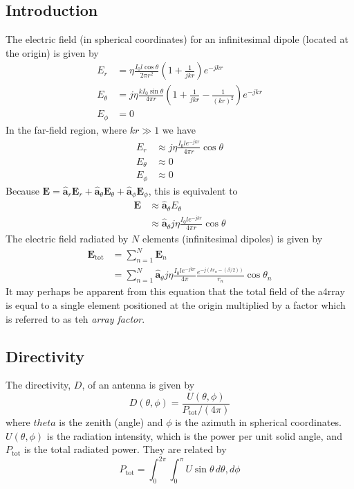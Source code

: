\documentclass[11pt]{report}
\theoremstyle{example}
\begin{document}
\subsection{Introduction}
The electric field (in spherical coordinates) for an infinitesimal dipole (located at the origin) is given by
\begin{align}
	E_r&=\eta\frac{I_0l\cos{\theta}}{2\pi r^2}\left(1+\frac{1}{jkr}\right)e^{-jkr}\\
	E_\theta&=j\eta\frac{kI_0\sin{\theta}}{4\pi r}\left(1+\frac{1}{jkr}-\frac{1}{(kr)^2}\right)e^{-jkr}\\
	E_\phi&=0
\end{align}
In the far-field region, where $kr\gg 1$ we have
\begin{align}
	E_r&\approx j\eta\frac{I_0le^{-jkr}}{4\pi r}\cos{\theta}\\
	E_\theta&\approx 0\\
	E_\phi&\approx 0
\end{align}
Because $\mathbf{E}=\mathbf{\hat{a}}_r\mathbf{E}_r+\mathbf{\hat{a}}_\theta\mathbf{E}_\theta+\mathbf{\hat{a}}_\phi\mathbf{E}_\phi$, this is equivalent to
\begin{equation}
	\begin{split}
		\mathbf{E}&\approx\mathbf{\hat{a}}_\theta E_\theta\\
		&\approx\mathbf{\hat{a}}_\theta j\eta\frac{I_0le^{-jkr}}{4\pi r}\cos{\theta}
	\end{split}
\end{equation}
The electric field radiated by $N$ elements (infinitesimal dipoles) is given by
\begin{equation}
	\begin{split}
		\mathbf{E}_\mathrm{tot}&=\sum_{n=1}^N{\mathbf{E}_n}\\
		&=\sum_{n=1}^N{\mathbf{\hat{a}}_\theta j\eta\frac{I_0le^{-jkr}}{4\pi}\frac{e^{-j(kr_n-(\beta/2))}}{r_n}\cos{\theta_n}}
	\end{split}
\end{equation}
	It may perhaps be apparent from this equation that the total field of the a4rray is equal to a single element positioned at the origin multiplied by a factor which is referred to as teh \emph{array factor}.

\subsection{Directivity}
The directivity, $D$, of an antenna is given by
\begin{equation}
	D(\theta,\phi)=\frac{U(\theta,\phi)}{P_\mathrm{tot}/(4\pi)}
\end{equation}
where $theta$ is the zenith (angle) and $\phi$ is the azimuth in spherical coordinates. $U(\theta,\phi)$ is the radiation intensity, which is the power per unit solid angle, and $P_\mathrm{tot}$ is the total radiated power. They are related by
\begin{equation}
	P_\mathrm{tot}=\int_0^{2\pi}{\int_0^\pi{U\sin{\theta}\,d\theta,d\phi}}
\end{equation}
\end{document}
